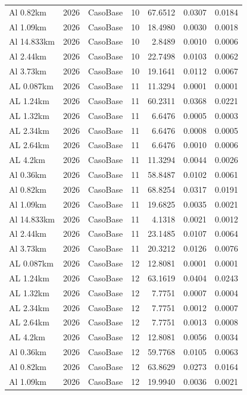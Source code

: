 \documentclass[11pt,a4paper]{article}
\begin{document}
\begin{longtable}{llllrrr}
Al 0.82km & 2026 & CasoBase & 10 & 67.6512 & 0.0307 & 0.0184 \\
Al 1.09km & 2026 & CasoBase & 10 & 18.4980 & 0.0030 & 0.0018 \\
Al 14.833km & 2026 & CasoBase & 10 & 2.8489 & 0.0010 & 0.0006 \\
Al 2.44km & 2026 & CasoBase & 10 & 22.7498 & 0.0103 & 0.0062 \\
Al 3.73km & 2026 & CasoBase & 10 & 19.1641 & 0.0112 & 0.0067 \\
AL 0.087km & 2026 & CasoBase & 11 & 11.3294 & 0.0001 & 0.0001 \\
AL 1.24km & 2026 & CasoBase & 11 & 60.2311 & 0.0368 & 0.0221 \\
AL 1.32km & 2026 & CasoBase & 11 & 6.6476 & 0.0005 & 0.0003 \\
AL 2.34km & 2026 & CasoBase & 11 & 6.6476 & 0.0008 & 0.0005 \\
AL 2.64km & 2026 & CasoBase & 11 & 6.6476 & 0.0010 & 0.0006 \\
AL 4.2km & 2026 & CasoBase & 11 & 11.3294 & 0.0044 & 0.0026 \\
Al 0.36km & 2026 & CasoBase & 11 & 58.8487 & 0.0102 & 0.0061 \\
Al 0.82km & 2026 & CasoBase & 11 & 68.8254 & 0.0317 & 0.0191 \\
Al 1.09km & 2026 & CasoBase & 11 & 19.6825 & 0.0035 & 0.0021 \\
Al 14.833km & 2026 & CasoBase & 11 & 4.1318 & 0.0021 & 0.0012 \\
Al 2.44km & 2026 & CasoBase & 11 & 23.1485 & 0.0107 & 0.0064 \\
Al 3.73km & 2026 & CasoBase & 11 & 20.3212 & 0.0126 & 0.0076 \\
AL 0.087km & 2026 & CasoBase & 12 & 12.8081 & 0.0001 & 0.0001 \\
AL 1.24km & 2026 & CasoBase & 12 & 63.1619 & 0.0404 & 0.0243 \\
AL 1.32km & 2026 & CasoBase & 12 & 7.7751 & 0.0007 & 0.0004 \\
AL 2.34km & 2026 & CasoBase & 12 & 7.7751 & 0.0012 & 0.0007 \\
AL 2.64km & 2026 & CasoBase & 12 & 7.7751 & 0.0013 & 0.0008 \\
AL 4.2km & 2026 & CasoBase & 12 & 12.8081 & 0.0056 & 0.0034 \\
Al 0.36km & 2026 & CasoBase & 12 & 59.7768 & 0.0105 & 0.0063 \\
Al 0.82km & 2026 & CasoBase & 12 & 63.8629 & 0.0273 & 0.0164 \\
Al 1.09km & 2026 & CasoBase & 12 & 19.9940 & 0.0036 & 0.0021 \\

\end{longtable}
\end{document}
